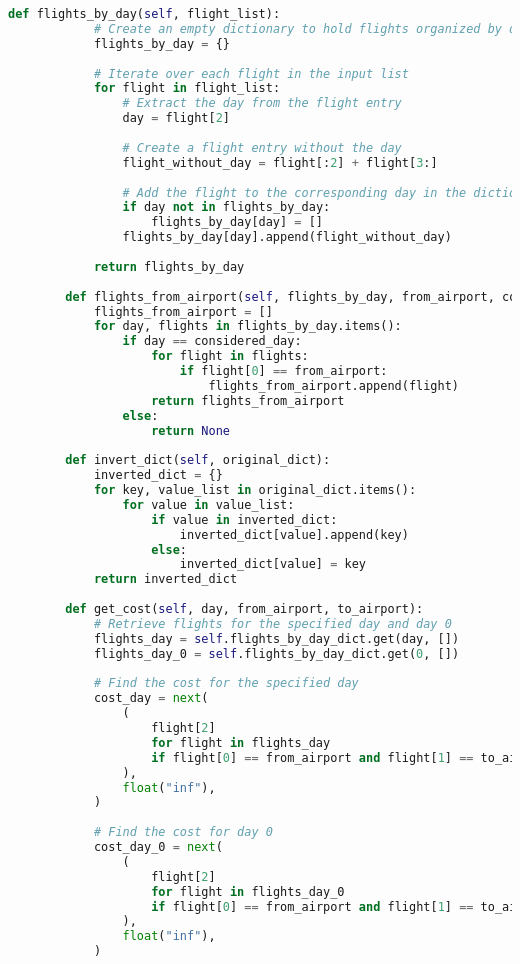 \begin{lstlisting}[language = Python]
        def flights_by_day(self, flight_list):
            # Create an empty dictionary to hold flights organized by day
            flights_by_day = {}
    
            # Iterate over each flight in the input list
            for flight in flight_list:
                # Extract the day from the flight entry
                day = flight[2]
    
                # Create a flight entry without the day
                flight_without_day = flight[:2] + flight[3:]
    
                # Add the flight to the corresponding day in the dictionary
                if day not in flights_by_day:
                    flights_by_day[day] = []
                flights_by_day[day].append(flight_without_day)
    
            return flights_by_day
    
        def flights_from_airport(self, flights_by_day, from_airport, considered_day):
            flights_from_airport = []
            for day, flights in flights_by_day.items():
                if day == considered_day:
                    for flight in flights:
                        if flight[0] == from_airport:
                            flights_from_airport.append(flight)
                    return flights_from_airport
                else:
                    return None
    
        def invert_dict(self, original_dict):
            inverted_dict = {}
            for key, value_list in original_dict.items():
                for value in value_list:
                    if value in inverted_dict:
                        inverted_dict[value].append(key)
                    else:
                        inverted_dict[value] = key
            return inverted_dict
    
        def get_cost(self, day, from_airport, to_airport):
            # Retrieve flights for the specified day and day 0
            flights_day = self.flights_by_day_dict.get(day, [])
            flights_day_0 = self.flights_by_day_dict.get(0, [])
    
            # Find the cost for the specified day
            cost_day = next(
                (
                    flight[2]
                    for flight in flights_day
                    if flight[0] == from_airport and flight[1] == to_airport
                ),
                float("inf"),
            )
    
            # Find the cost for day 0
            cost_day_0 = next(
                (
                    flight[2]
                    for flight in flights_day_0
                    if flight[0] == from_airport and flight[1] == to_airport
                ),
                float("inf"),
            )
    

\end{lstlisting}
